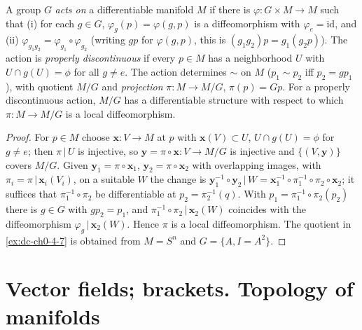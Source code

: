\begin{example}
  \label{ex:dc-ch0-4-8}


  A group $G$ \emph{acts on} a differentiable manifold $M$ if there is
  $\varphi:G\times M\to M$ such that (i) for each $g\in G$, $\varphi_g(p)=\varphi(g,p)$
  is a diffeomorphism with $\varphi_e=\mathrm{id}$, and (ii)
  $\varphi_{g_1 g_2}=\varphi_{g_1}\circ\varphi_{g_2}$ (writing $gp$ for $\varphi(g,p)$,
  this is $(g_1 g_2)p=g_1(g_2 p)$). The action is \emph{properly discontinuous} if every
  $p\in M$ has a neighborhood $U$ with $U\cap g(U)=\phi$ for all $g\neq e$. The
  action determines $\sim$ on $M$ ($p_1\sim p_2$ iff $p_2=gp_1$), with quotient
  $M/G$ and \emph{projection} $\pi:M\to M/G$, $\pi(p)=Gp$.
  For a properly discontinuous action, $M/G$ has a differentiable structure with
  respect to which $\pi:M\to M/G$ is a local diffeomorphism.
\end{example}
\begin{proof}
  \sketch
  For $p\in M$ choose $\mathbf{x}:V\to M$ at $p$ with $\mathbf{x}(V)\subset
  U$, $U\cap g(U)=\phi$ for $g\neq e$; then $\pi\,|\,U$ is injective, so
  $\mathbf{y}=\pi\circ\mathbf{x}:V\to M/G$ is injective and $\{(V,\mathbf{y})\}$
  covers $M/G$. Given $\mathbf{y}_1=\pi\circ\mathbf{x}_1$,
  $\mathbf{y}_2=\pi\circ\mathbf{x}_2$ with overlapping images, with $\pi_i=\pi\,|\,\mathbf{x}_i(V_i)$,
  on a suitable $W$ the change is
  $\mathbf{y}_1^{-1}\circ\mathbf{y}_2\,|\,W=\mathbf{x}_1^{-1}\circ\pi_1^{-1}\circ\pi_2\circ\mathbf{x}_2$;
  it suffices that $\pi_1^{-1}\circ\pi_2$ be differentiable at
  $p_2=\pi_2^{-1}(q)$. With $p_1=\pi_1^{-1}\circ\pi_2(p_2)$ there is $g\in G$ with
  $gp_2=p_1$, and $\pi_1^{-1}\circ\pi_2\,|\,\mathbf{x}_2(W)$ coincides with the
  diffeomorphism $\varphi_g\,|\,\mathbf{x}_2(W)$. Hence $\pi$ is a local
  diffeomorphism. The quotient in \cref{ex:dc-ch0-4-7} is obtained from
  $M=S^n$ and $G=\{A,I=A^2\}$.
\end{proof}

\section{Vector fields; brackets. Topology of manifolds}

